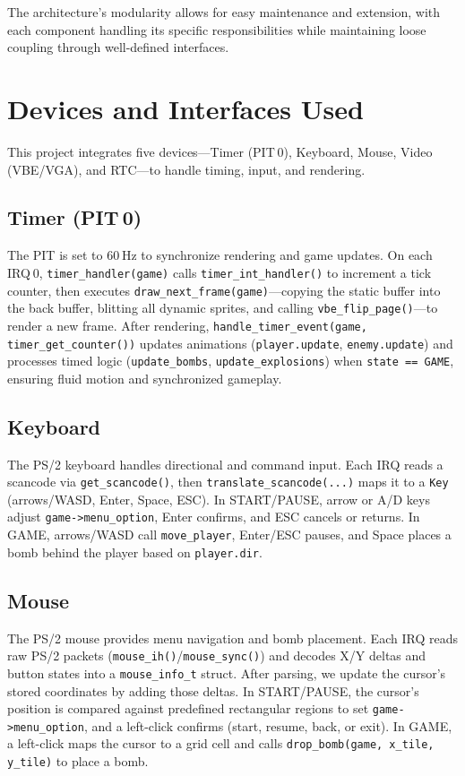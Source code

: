 \documentclass[12pt,a4paper]{article}
\begin{document}
The architecture's modularity allows for easy maintenance and extension, with each component handling its specific responsibilities while maintaining loose coupling through well-defined interfaces.

\section{Devices and Interfaces Used}
This project integrates five devices—Timer (PIT 0), Keyboard, Mouse, Video (VBE/VGA), and RTC—to handle timing, input, and rendering.

\subsection*{Timer (PIT 0)}
The PIT is set to 60 Hz to synchronize rendering and game updates. On each IRQ 0, \texttt{timer\_handler(game)} calls \texttt{timer\_int\_handler()} to increment a tick counter, then executes \texttt{draw\_next\_frame(game)}—copying the static buffer into the back buffer, blitting all dynamic sprites, and calling \texttt{vbe\_flip\_page()}—to render a new frame. After rendering, \texttt{handle\_timer\_event(game, timer\_get\_counter())} updates animations (\texttt{player.update}, \texttt{enemy.update}) and processes timed logic (\texttt{update\_bombs}, \texttt{update\_explosions}) when \texttt{state == GAME}, ensuring fluid motion and synchronized gameplay.

\subsection*{Keyboard}
The PS/2 keyboard handles directional and command input. Each IRQ reads a scancode via \texttt{get\_scancode()}, then \texttt{translate\_scancode(...)} maps it to a \texttt{Key} (arrows/WASD, Enter, Space, ESC). In START/PAUSE, arrow or A/D keys adjust \texttt{game->menu\_option}, Enter confirms, and ESC cancels or returns. In GAME, arrows/WASD call \texttt{move\_player}, Enter/ESC pauses, and Space places a bomb behind the player based on \texttt{player.dir}.

\subsection*{Mouse}
The PS/2 mouse provides menu navigation and bomb placement. Each IRQ reads raw PS/2 packets (\texttt{mouse\_ih()}/\texttt{mouse\_sync()}) and decodes X/Y deltas and button states into a \texttt{mouse\_info\_t} struct. After parsing, we update the cursor’s stored coordinates by adding those deltas. In START/PAUSE, the cursor’s position is compared against predefined rectangular regions to set \texttt{game->menu\_option}, and a left-click confirms (start, resume, back, or exit). In GAME, a left-click maps the cursor to a grid cell and calls \texttt{drop\_bomb(game, x\_tile, y\_tile)} to place a bomb.
\end{document}
